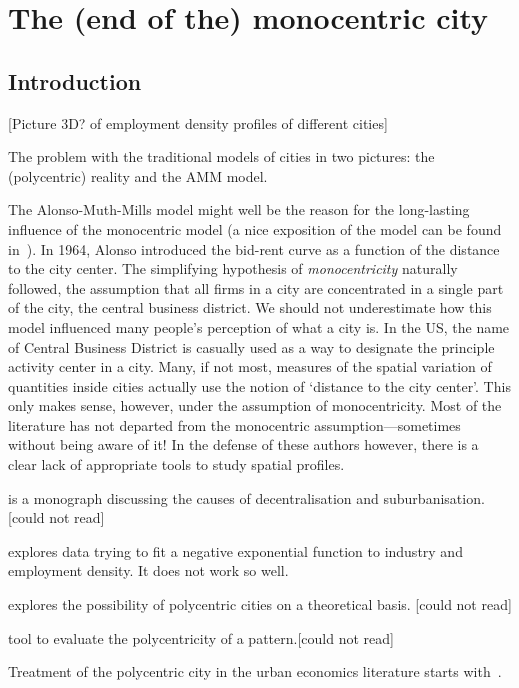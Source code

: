%
\chapter{The (end of the) monocentric city}
\label{sec:related}


\section{Introduction}
\label{sec:introduction}

[Picture 3D? of employment density profiles of different cities]

The problem with the traditional models of cities in two pictures: the
(polycentric) reality and the AMM model.


The Alonso-Muth-Mills model might well be the reason for the long-lasting influence of
the monocentric model (a nice exposition of the model can be found
in~\cite{Fujita:1989}). In 1964, Alonso introduced the bid-rent curve as a
function of the distance to the city center. The simplifying hypothesis of
\emph{monocentricity} naturally followed, the assumption that all firms in a
city are concentrated in a single part of the city, the central business
district. We should not underestimate how this model influenced many people's
perception of what a city is. In the US, the name of Central Business District
is casually used as a way to designate the principle activity center in a city.
Many, if not most, measures of the spatial variation of quantities inside cities
actually use the notion of `distance to the city center'. This only makes sense,
however, under the assumption of monocentricity. Most of the
literature has not departed from the monocentric assumption---sometimes without
being aware of it! In the defense of these authors however, there is a clear
lack of appropriate tools to study spatial profiles.


\cite{Mills:1972} is a monograph discussing the causes of decentralisation and
suburbanisation. [could not read]

\cite{Kemper:1974} explores data trying to fit a negative exponential function
to industry and employment density. It does not work so well.

\cite{Odland:1978} explores the possibility of polycentric cities on a
theoretical basis. [could not read]

\cite{Griffith:1981} tool to evaluate the polycentricity of a pattern.[could not
read]

Treatment of the polycentric city in the urban economics literature starts
with~\cite{Fujita:1982}.

